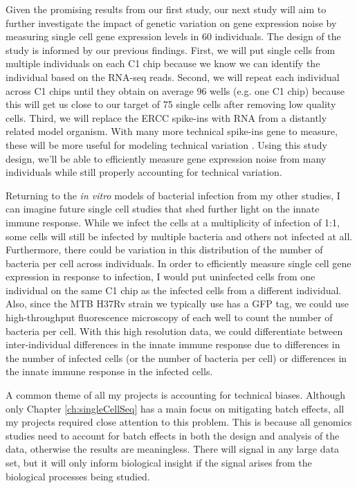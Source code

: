 Given the promising results from our first study, our next study will
aim to further investigate the impact of genetic variation on gene
expression noise by measuring single cell gene expression levels in 60
individuals. The design of the study is informed by our previous
findings. First, we will put single cells from multiple individuals on
each C1 chip because we know we can identify the individual based on
the RNA-seq reads. Second, we will repeat each individual across C1
chips until they obtain on average 96 wells (e.g. one C1 chip) because
this will get us close to our target of 75 single cells after removing
low quality cells. Third, we will replace the ERCC spike-ins with RNA
from a distantly related model organism. With many more technical
spike-ins gene to measure, these will be more useful for modeling
technical variation \citep{Risso2014}. Using this study design, we’ll
be able to efficiently measure gene expression noise from many
individuals while still properly accounting for technical variation.

Returning to the \emph{in vitro} models of bacterial infection from my
other studies, I can imagine future single cell studies that shed
further light on the innate immune response. While we infect the cells
at a multiplicity of infection of 1:1, some cells will still be
infected by multiple bacteria and others not infected at
all. Furthermore, there could be variation in this distribution of the
number of bacteria per cell across individuals. In order to
efficiently measure single cell gene expression in response to
infection, I would put uninfected cells from one individual on the
same C1 chip as the infected cells from a different individual. Also,
since the MTB H37Rv strain we typically use has a GFP tag, we could
use high-throughput fluorescence microscopy of each well to count the
number of bacteria per cell. With this high resolution data, we could
differentiate between inter-individual differences in the innate
immune response due to differences in the number of infected cells (or
the number of bacteria per cell) or differences in the innate immune
response in the infected cells.

A common theme of all my projects is accounting for technical
biases. Although only Chapter \ref{ch:singleCellSeq} has a main focus
on mitigating batch effects, all my projects required close attention
to this problem. This is because all genomics studies need to account
for batch effects in both the design and analysis of the data,
otherwise the results are meaningless. There will signal in any large
data set, but it will only inform biological insight if the signal
arises from the biological processes being studied.

